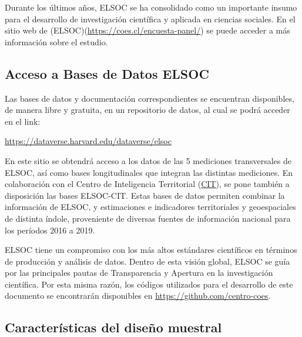 \documentclass[
  12pt,
]{book}
\begin{document}
Durante los últimos años, ELSOC se ha consolidado como un importante insumo para el desarrollo de investigación científica y aplicada en ciencias sociales. En el sitio web de (ELSOC)(\url{https://coes.cl/encuesta-panel/}) se puede acceder a más información sobre el estudio.

\hypertarget{acceso-a-bases-de-datos-elsoc}{%
\subsection{Acceso a Bases de Datos ELSOC}\label{acceso-a-bases-de-datos-elsoc}}

Las bases de datos y documentación correspondientes se encuentran disponibles, de manera libre y gratuita, en un repositorio de datos, al cual se podrá acceder en el link:

\url{https://dataverse.harvard.edu/dataverse/elsoc}

En este sitio se obtendrá acceso a los datos de las 5 mediciones transversales de ELSOC, así como bases longitudinales que integran las distintas mediciones. En colaboración con el Centro de Inteligencia Territorial (\href{https://cit.uai.cl/}{CIT}), se pone también a disposición las bases ELSOC-CIT. Estas bases de datos permiten combinar la información de ELSOC, y estimaciones e indicadores territoriales y geoespaciales de distinta índole, proveniente de diversas fuentes de información nacional para los períodos 2016 a 2019.

ELSOC tiene un compromiso con los más altos estándares científicos en términos de producción y análisis de datos. Dentro de esta visión global, ELSOC se guía por las principales pautas de Transparencia y Apertura en la investigación científica. Por esta misma razón, los códigos utilizados para el desarrollo de este documento se encontrarán disponibles en \url{https://github.com/centro-coes}.

\hypertarget{caracteruxedsticas-del-diseuxf1o-muestral}{%
\subsection{Características del diseño muestral}\label{caracteruxedsticas-del-diseuxf1o-muestral}}
\end{document}

